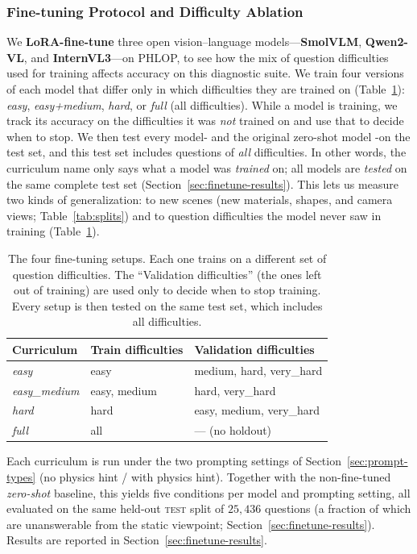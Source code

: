 \documentclass[conference]{IEEEtran}
\begin{document}
\subsubsection{Fine-tuning Protocol and Difficulty Ablation}
\label{sec:finetune}
We  \textbf{LoRA-fine-tune} three open vision--language models---\textbf{SmolVLM}, \textbf{Qwen2-VL}, and \textbf{InternVL3}---on PHLOP, to see how the mix of question difficulties used for training affects accuracy on this diagnostic suite. We train four versions of each model that differ only in which difficulties they are trained on (Table~\ref{tab:ftconfig}): \textit{easy}, \textit{easy+medium}, \textit{hard}, or \textit{full} (all difficulties). While a model is training, we track its accuracy on the difficulties it was \emph{not} trained on and use that to decide when to stop. We then test every model- and the original zero-shot model -on the test set, and this test set includes questions of \emph{all} difficulties. In other words, the curriculum name only says what a model was \emph{trained} on; all models are \emph{tested} on the same complete test set (Section~\ref{sec:finetune-results}). This lets us measure two kinds of generalization: to new scenes (new materials, shapes, and camera views; Table~\ref{tab:splits}) and to question difficulties the model never saw in training (Table~\ref{tab:ftconfig}).

\begin{table}[t]
\centering
\caption{The four fine-tuning setups. Each one trains on a different set of question difficulties. The ``Validation difficulties'' (the ones left out of training) are used only to decide when to stop training. Every setup is then tested on the same test set, which includes all difficulties.}

\label{tab:ftconfig}
\small
\begin{tabular}{lll}
\toprule
Curriculum & Train difficulties & Validation difficulties \\
\midrule
\textit{easy}         & easy         & medium, hard, very\_hard \\
\textit{easy\_medium} & easy, medium & hard, very\_hard \\
\textit{hard}         & hard         & easy, medium, very\_hard \\
\textit{full}         & all          & --- (no holdout) \\
\bottomrule
\end{tabular}
\end{table}
Each curriculum is run under the two prompting settings of Section~\ref{sec:prompt-types} (no physics hint / with physics hint). Together with the non-fine-tuned \emph{zero-shot} baseline, this yields five conditions per model and prompting setting, all evaluated on the same held-out \textsc{test} split of $25{,}436$ questions (a fraction of which are unanswerable from the static viewpoint; Section~\ref{sec:finetune-results}). Results are reported in Section~\ref{sec:finetune-results}.
\end{document}
